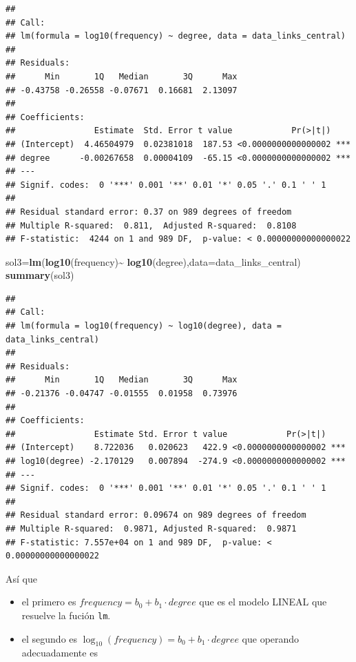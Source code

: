 \documentclass[
]{article}
\newenvironment{Shaded}{\begin{snugshade}}{\end{snugshade}}
\newcommand{\DataTypeTok}[1]{\textcolor[rgb]{0.13,0.29,0.53}{#1}}
\newcommand{\KeywordTok}[1]{\textcolor[rgb]{0.13,0.29,0.53}{\textbf{#1}}}
\newcommand{\NormalTok}[1]{#1}
\newcommand{\OperatorTok}[1]{\textcolor[rgb]{0.81,0.36,0.00}{\textbf{#1}}}
\newcommand{\StringTok}[1]{\textcolor[rgb]{0.31,0.60,0.02}{#1}}
\providecommand{\tightlist}{%
  \setlength{\itemsep}{0pt}\setlength{\parskip}{0pt}}
\begin{document}
\begin{verbatim}
## 
## Call:
## lm(formula = log10(frequency) ~ degree, data = data_links_central)
## 
## Residuals:
##      Min       1Q   Median       3Q      Max 
## -0.43758 -0.26558 -0.07671  0.16681  2.13097 
## 
## Coefficients:
##                Estimate  Std. Error t value            Pr(>|t|)    
## (Intercept)  4.46504979  0.02381018  187.53 <0.0000000000000002 ***
## degree      -0.00267658  0.00004109  -65.15 <0.0000000000000002 ***
## ---
## Signif. codes:  0 '***' 0.001 '**' 0.01 '*' 0.05 '.' 0.1 ' ' 1
## 
## Residual standard error: 0.37 on 989 degrees of freedom
## Multiple R-squared:  0.811,  Adjusted R-squared:  0.8108 
## F-statistic:  4244 on 1 and 989 DF,  p-value: < 0.00000000000000022
\end{verbatim}

\begin{Shaded}
\begin{Highlighting}[]
\NormalTok{sol3=}\KeywordTok{lm}\NormalTok{(}\KeywordTok{log10}\NormalTok{(frequency)}\OperatorTok{\textasciitilde{}}\StringTok{ }\KeywordTok{log10}\NormalTok{(degree),}\DataTypeTok{data=}\NormalTok{data\_links\_central)}
\KeywordTok{summary}\NormalTok{(sol3)}
\end{Highlighting}
\end{Shaded}

\begin{verbatim}
## 
## Call:
## lm(formula = log10(frequency) ~ log10(degree), data = data_links_central)
## 
## Residuals:
##      Min       1Q   Median       3Q      Max 
## -0.21376 -0.04747 -0.01555  0.01958  0.73976 
## 
## Coefficients:
##                Estimate Std. Error t value            Pr(>|t|)    
## (Intercept)    8.722036   0.020623   422.9 <0.0000000000000002 ***
## log10(degree) -2.170129   0.007894  -274.9 <0.0000000000000002 ***
## ---
## Signif. codes:  0 '***' 0.001 '**' 0.01 '*' 0.05 '.' 0.1 ' ' 1
## 
## Residual standard error: 0.09674 on 989 degrees of freedom
## Multiple R-squared:  0.9871, Adjusted R-squared:  0.9871 
## F-statistic: 7.557e+04 on 1 and 989 DF,  p-value: < 0.00000000000000022
\end{verbatim}

Así que

\begin{itemize}
\tightlist
\item
  el primero es \(frequency = b_0+b_1\cdot degree\) que es el modelo
  LINEAL que resuelve la fución \texttt{lm}.
\item
  el segundo es \(\log_{10}(frequency) = b_0+b_1\cdot degree\) que
  operando adecuadamente es
\end{itemize}
\end{document}
